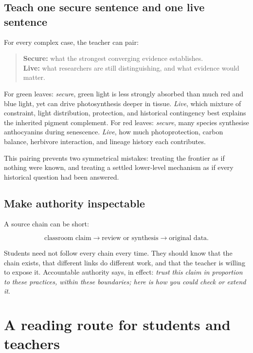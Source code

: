 \subsection{Teach one secure sentence and one live sentence}

For every complex case, the teacher can pair:

\begin{quote}
\textbf{Secure:} what the strongest converging evidence establishes.\\
\textbf{Live:} what researchers are still distinguishing, and what evidence would matter.
\end{quote}

For green leaves: \emph{secure}, green light is less strongly absorbed than much red and blue light, yet can drive photosynthesis deeper in tissue. \emph{Live}, which mixture of constraint, light distribution, protection, and historical contingency best explains the inherited pigment complement. For red leaves: \emph{secure}, many species synthesise anthocyanins during senescence. \emph{Live}, how much photoprotection, carbon balance, herbivore interaction, and lineage history each contributes.

This pairing prevents two symmetrical mistakes: treating the frontier as if nothing were known, and treating a settled lower-level mechanism as if every historical question had been answered.

\subsection{Make authority inspectable}

A source chain can be short:

\begin{equation*}
\text{classroom claim} \longrightarrow \text{review or synthesis} \longrightarrow \text{original data}.
\end{equation*}

Students need not follow every chain every time. They should know that the chain exists, that different links do different work, and that the teacher is willing to expose it. Accountable authority says, in effect: \emph{trust this claim in proportion to these practices, within these boundaries; here is how you could check or extend it}.

\section{A reading route for students and teachers}

